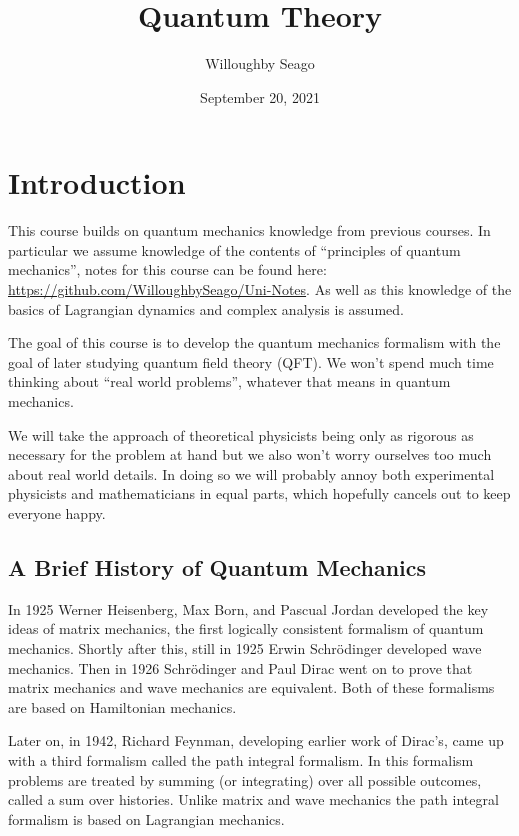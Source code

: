 \documentclass[fleqn]{NotesClass}
\title{Quantum Theory}
\author{Willoughby Seago}
\date{September 20, 2021}
\begin{document}
    \frontmatter
    \titlepage
    \tableofcontents
    \mainmatter
    
    \chapter{Introduction}
    This course builds on quantum mechanics knowledge from previous courses.
    In particular we assume knowledge of the contents of \enquote{principles of quantum mechanics}, notes for this course can be found here: \url{https://github.com/WilloughbySeago/Uni-Notes}.
    As well as this knowledge of the basics of Lagrangian dynamics and complex analysis is assumed.
    
    The goal of this course is to develop the quantum mechanics formalism with the goal of later studying quantum field theory (QFT).
    We won't spend much time thinking about \enquote{real world problems}, whatever that means in quantum mechanics.
    
    We will take the approach of theoretical physicists being only as rigorous as necessary for the problem at hand but we also won't worry ourselves too much about real world details.
    In doing so we will probably annoy both experimental physicists and mathematicians in equal parts, which hopefully cancels out to keep everyone happy.
    
    \section{A Brief History of Quantum Mechanics}
    In 1925 Werner Heisenberg, Max Born, and Pascual Jordan developed the key ideas of matrix mechanics, the first logically consistent formalism of quantum mechanics.
    Shortly after this, still in 1925 Erwin Schr\"odinger developed wave mechanics.
    Then in 1926 Schr\"odinger and Paul Dirac went on to prove that matrix mechanics and wave mechanics are equivalent.
    Both of these formalisms are based on Hamiltonian mechanics.
    
    Later on, in 1942, Richard Feynman, developing earlier work of Dirac's, came up with a third formalism called the path integral formalism.
    In this formalism problems are treated by summing (or integrating) over all possible outcomes, called a sum over histories.
    Unlike matrix and wave mechanics the path integral formalism is based on Lagrangian mechanics.
    
\end{document}
